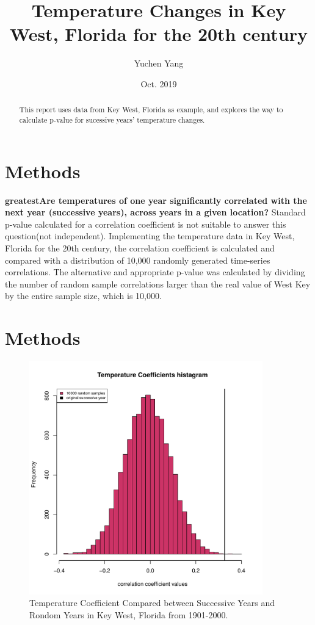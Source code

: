 \documentclass[10pt]{article}
\title{Temperature Changes in Key West, Florida for the 20th century}
\author{Yuchen Yang}
\date{Oct. 2019}
\begin{document}
  \maketitle

  \begin{abstract}
  This report uses data from Key West, Florida as example, and explores the way to calculate p-value for sucessive years' temperature changes.
  \end{abstract}

  \section{Methods}
    \textbf{greatestAre temperatures of one year significantly correlated with the next year (successive years), across years in a given location?} Standard p-value calculated for a correlation coefficient is not suitable to answer this question(not independent). Implementing the temperature data in Key West, Florida for the 20th century, the correlation coefficient is calculated and compared with a distribution of 10,000 randomly generated time-series correlations. The alternative and appropriate p-value was calculated by dividing the number of random sample correlations larger than the real value of West Key by the entire sample size, which is 10,000.

  \section{Methods}
    \begin{figure}[H]
    \centering
    \includegraphics[width=0.90\textwidth]{../Results/TAutoCorr_graph.pdf}
    \caption{Temperature Coefficient Compared between Successive Years and Rondom Years in Key West, Florida from 1901-2000.}
    \end{figure}
\end{document}

